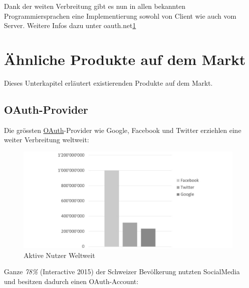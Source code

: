 Dank der weiten Verbreitung gibt es nun in allen bekannten
Programmiersprachen eine Implementierung sowohl von Client wie auch vom
Server. Weitere Infos dazu unter oauth.net\href{http://oauth.net/2/}{1}

\newpage

\section{Ähnliche Produkte auf dem
Markt}\label{uxe4hnliche-produkte-auf-dem-markt}

Dieses Unterkapitel erläutert existierenden Produkte auf dem Markt.

\subsection{OAuth-Provider}\label{oauth-provider}

Die grössten \protect\hyperlink{oauth}{OAuth}-Provider wie Google,
Facebook und Twitter erziehlen eine weiter Verbreitung weltweit:

\begin{figure}[htbp]
\centering
\includegraphics{images/excel-statistik/socialmedia-aktivenutzer.jpg}
\caption[Aktive Nutzer Weltweit]{Aktive Nutzer Weltweit\footnotemark{}}
\end{figure}

Ganze \emph{78\%} (Interactive 2015) der Schweizer Bevölkerung nutzten
SocialMedia und besitzen dadurch einen OAuth-Account:


